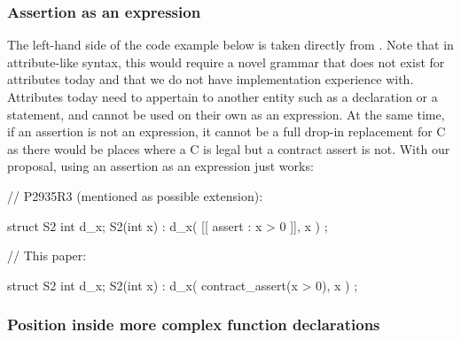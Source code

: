 

\subsubsection{Assertion as an expression}

The left-hand side of the code example below is taken directly from \cite{P2935R3}. Note that in attribute-like syntax, this would require a novel grammar that does not exist for attributes today and that we do not have implementation experience with. Attributes today need to appertain to another entity such as a declaration or a statement, and cannot be used on their own as an expression. At the same time, if an assertion is not an expression, it cannot be a full drop-in replacement for C  as there would be places where a C  is legal but a contract assert is not. With our proposal, using an assertion as an expression just works:
\vspace{5mm}

\begin{minipage}{8cm}
\begin{codeblock}
// P2935R3 (mentioned as possible extension):

struct S2 {
  int d_x;
  S2(int x)
    : d_x( [[ assert : x > 0 ]], x )
  {}
};
\end{codeblock}
\end{minipage}
\begin{minipage}{8cm}
\begin{codeblock}
// This paper:

struct S2 {
  int d_x;
  S2(int x)
    : d_x( contract_assert(x > 0), x )
  {}
};
\end{codeblock}
\end{minipage}

\subsubsection{Position inside more complex function declarations}

